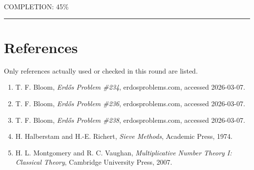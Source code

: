 COMPLETION: 45\%

\bigskip
\hrule
\bigskip

\section*{References}

Only references actually used or checked in this round are listed.

\begin{enumerate}
\item T. F. Bloom, \emph{Erd\H{o}s Problem \#234}, erdosproblems.com, accessed 2026-03-07.
\item T. F. Bloom, \emph{Erd\H{o}s Problem \#236}, erdosproblems.com, accessed 2026-03-07.
\item T. F. Bloom, \emph{Erd\H{o}s Problem \#238}, erdosproblems.com, accessed 2026-03-07.
\item H. Halberstam and H.-E. Richert, \emph{Sieve Methods}, Academic Press, 1974.
\item H. L. Montgomery and R. C. Vaughan, \emph{Multiplicative Number Theory I: Classical Theory}, Cambridge University Press, 2007.
\end{enumerate}
